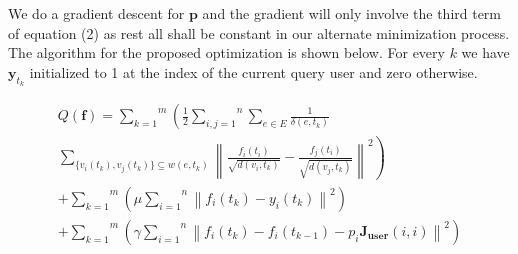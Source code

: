 \documentclass[conference]{IEEEtran}
\begin{document}
We do a gradient descent for $\mathbf{p}$ and the gradient will only involve the third term of equation (2) as rest all shall be constant in our alternate minimization process. The algorithm for the proposed optimization is shown below. For every $k$ we have $\mathbf{y}_{t_k}$ initialized to 1 at the index of the current query user and zero otherwise.

\begin{equation}
\begin{align}

Q(\mathbf{f}) = \overset{m}{\underset{k=1}{\sum}} \left ( \frac{1}{2} \overset{n}{\underset{i,j=1}{\sum}} \underset{e \in E}{\sum} \frac{1}{\delta(e,t_k)} \right. \\ \left. \underset{ \{v_i(t_k), v_j(t_k) \}{ \subseteq w(e,t_k)}}{\sum} \left \| \frac{f_i(t_i)}{\sqrt{d(v_i,t_k)}} - \frac{f_j(t_i)}{\sqrt{d(v_j,t_k)}} \right \|^{2} \right ) \\ + \overset{m}{\underset{k=1}{\sum}} \left( \mu \overset{n}{\underset{i=1}{\sum}} \left\|f_i(t_k) - y_i(t_k)\right\|^{2} \right ) 
\\ + \overset{m}{\underset{k=1}{\sum}} \left( \gamma \overset{n}{\underset{i=1}{\sum}} \left\|f_i(t_k) - f_i(t_{k-1}) - p_i \mathbf{J_{user}}(i,i)\right\|^{2} \right ) 

\end{align}
\end{equation}
\end{document}
